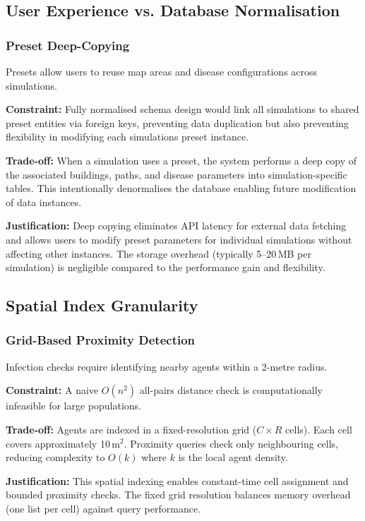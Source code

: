 \subsection{User Experience vs. Database Normalisation}

\subsubsection*{Preset Deep-Copying}
Presets allow users to reuse map areas and disease configurations across simulations.

\textbf{Constraint:} Fully normalised schema design would link all simulations to shared preset entities via foreign keys, preventing data duplication but also preventing flexibility in modifying each simulations preset instance.

\textbf{Trade-off:} When a simulation uses a preset, the system performs a deep copy of the associated buildings, paths, and disease parameters into simulation-specific tables. This intentionally denormalises the database enabling future modification of data instances.

\textbf{Justification:} Deep copying eliminates API latency for external data fetching and allows users to modify preset parameters for individual simulations without affecting other instances. The storage overhead (typically 5–20\,MB per simulation) is negligible compared to the performance gain and flexibility.

\subsection{Spatial Index Granularity}

\subsubsection*{Grid-Based Proximity Detection}
Infection checks require identifying nearby agents within a 2-metre radius.

\textbf{Constraint:} A naive $O(n^2)$ all-pairs distance check is computationally infeasible for large populations.

\textbf{Trade-off:} Agents are indexed in a fixed-resolution grid ($C \times R$ cells). Each cell covers approximately 10\,m$^2$. Proximity queries check only neighbouring cells, reducing complexity to $O(k)$ where $k$ is the local agent density.

\textbf{Justification:} This spatial indexing enables constant-time cell assignment and bounded proximity checks. The fixed grid resolution balances memory overhead (one list per cell) against query performance.

